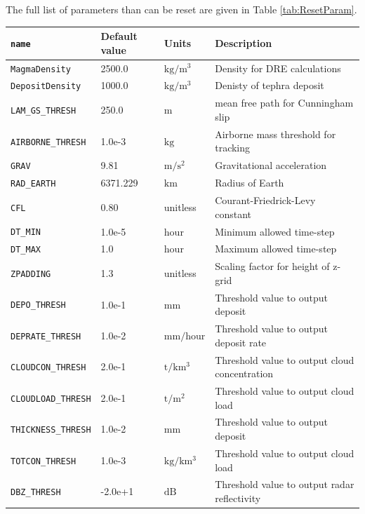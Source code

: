 The full list of parameters than can be reset are given in Table \ref{tab:ResetParam}.
\small
\begin{table}[htbp]
\begin{center}
\begin{tabular}{| l | l | l | l |}
\hline
\texttt{name} & Default value & Units & Description \\
\hline
\texttt{MagmaDensity}      & 2500.0   & $\mathrm{kg/m^3}$  &  Density for DRE calculations\\
\texttt{DepositDensity}    & 1000.0   & $\mathrm{kg/m^3}$  &  Denisty of tephra deposit\\
\texttt{LAM\_GS\_THRESH}   & 250.0    & $\mathrm{m}$       &  mean free path for Cunningham slip\\
\texttt{AIRBORNE\_THRESH}  & 1.0e-3   & $\mathrm{kg}$      &  Airborne mass threshold for tracking\\
\texttt{GRAV}              & 9.81     & $\mathrm{m/s^2}$   &  Gravitational acceleration\\
\texttt{RAD\_EARTH}        & 6371.229 & $\mathrm{km}$      &  Radius of Earth\\
\texttt{CFL}               & 0.80     & unitless           &  Courant-Friedrick-Levy constant\\
\texttt{DT\_MIN}           & 1.0e-5   & $\mathrm{hour}$    &  Minimum allowed time-step\\
\texttt{DT\_MAX}           & 1.0      & $\mathrm{hour}$    &  Maximum allowed time-step\\
\texttt{ZPADDING}          & 1.3      & unitless           &  Scaling factor for height of z-grid\\
\texttt{DEPO\_THRESH}      & 1.0e-1   & $\mathrm{mm}$      &  Threshold value to output deposit\\
\texttt{DEPRATE\_THRESH}   & 1.0e-2   & $\mathrm{mm/hour}$ &  Threshold value to output deposit rate\\
\texttt{CLOUDCON\_THRESH}  & 2.0e-1   & $\mathrm{t/km^3}$  &  Threshold value to output cloud concentration\\
\texttt{CLOUDLOAD\_THRESH} & 2.0e-1   & $\mathrm{t/m^2}$   &  Threshold value to output cloud load\\
\texttt{THICKNESS\_THRESH} & 1.0e-2   & $\mathrm{mm}$      &  Threshold value to output deposit\\
\texttt{TOTCON\_THRESH}    & 1.0e-3   & $\mathrm{kg/km^3}$ &  Threshold value to output cloud load\\
\texttt{DBZ\_THRESH}       & -2.0e+1  & $\mathrm{dB}$      &  Threshold value to output radar reflectivity\\

\end{tabular}
\end{center}
\end{table}
